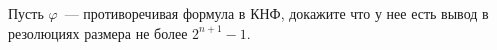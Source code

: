 Пусть $\varphi$~--- противоречивая формула в КНФ, докажите что у нее есть вывод в резолюциях размера не
более $2^{n + 1} - 1$.
